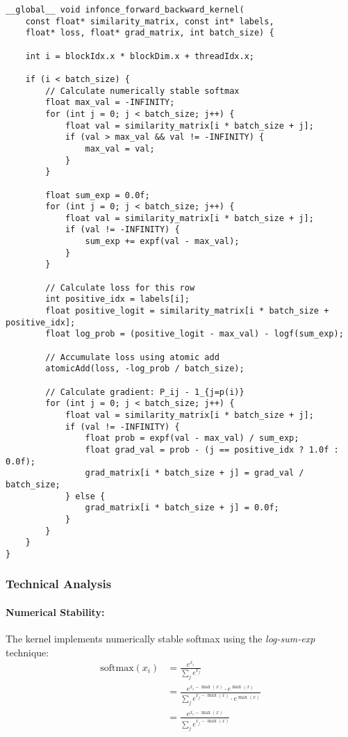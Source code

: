 \documentclass[a4paper,11pt]{article}
\begin{document}
\begin{lstlisting}[caption={Kernel for loss and gradient calculation}]
__global__ void infonce_forward_backward_kernel(
    const float* similarity_matrix, const int* labels,
    float* loss, float* grad_matrix, int batch_size) {
    
    int i = blockIdx.x * blockDim.x + threadIdx.x;
    
    if (i < batch_size) {
        // Calculate numerically stable softmax
        float max_val = -INFINITY;
        for (int j = 0; j < batch_size; j++) {
            float val = similarity_matrix[i * batch_size + j];
            if (val > max_val && val != -INFINITY) {
                max_val = val;
            }
        }
        
        float sum_exp = 0.0f;
        for (int j = 0; j < batch_size; j++) {
            float val = similarity_matrix[i * batch_size + j];
            if (val != -INFINITY) {
                sum_exp += expf(val - max_val);
            }
        }
        
        // Calculate loss for this row
        int positive_idx = labels[i];
        float positive_logit = similarity_matrix[i * batch_size + positive_idx];
        float log_prob = (positive_logit - max_val) - logf(sum_exp);
        
        // Accumulate loss using atomic add
        atomicAdd(loss, -log_prob / batch_size);
        
        // Calculate gradient: P_ij - 1_{j=p(i)}
        for (int j = 0; j < batch_size; j++) {
            float val = similarity_matrix[i * batch_size + j];
            if (val != -INFINITY) {
                float prob = expf(val - max_val) / sum_exp;
                float grad_val = prob - (j == positive_idx ? 1.0f : 0.0f);
                grad_matrix[i * batch_size + j] = grad_val / batch_size;
            } else {
                grad_matrix[i * batch_size + j] = 0.0f;
            }
        }
    }
}
\end{lstlisting}

\subsubsection{Technical Analysis}

\paragraph{Numerical Stability:}
The kernel implements numerically stable softmax using the \emph{log-sum-exp} technique:
\begin{align}
\text{softmax}(x_i) &= \frac{e^{x_i}}{\sum_j e^{x_j}} \\
&= \frac{e^{x_i - \max(x)} \cdot e^{\max(x)}}{\sum_j e^{x_j - \max(x)} \cdot e^{\max(x)}} \\
&= \frac{e^{x_i - \max(x)}}{\sum_j e^{x_j - \max(x)}}
\end{align}
\end{document}
